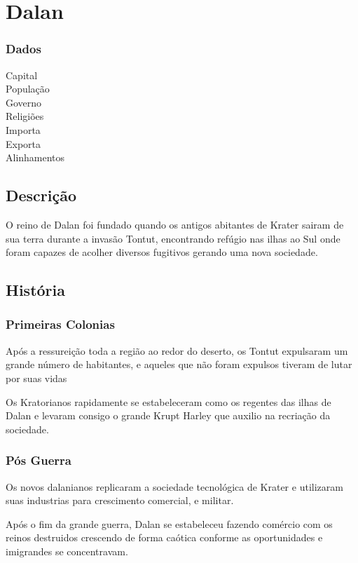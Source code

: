\section{Dalan}
\subsubsection{Dados}
  \begin{description}
   \item[Capital]
   \item[Popula\c{c}\~ao]
   \item[Governo]
   \item[Religi\~oes]
   \item[Importa]
   \item[Exporta]
   \item[Alinhamentos]
  \end{description}

\subsection{Descri\c{c}\~ao}

O reino de Dalan foi fundado quando os antigos abitantes de Krater sairam de sua
terra durante a invas\~{a}o Tontut, encontrando ref\'ugio nas ilhas ao Sul onde
foram capazes de acolher diversos fugitivos gerando uma nova sociedade.

\subsection{Hist\'oria}
\subsubsection{Primeiras Colonias}
Ap\'os a ressurei\c{c}\~ao toda a regi\~ao ao redor do deserto, os Tontut expulsaram
um grande n\'umero de habitantes, e aqueles que n\~ao foram expulsos tiveram de lutar
por suas vidas

Os Kratorianos rapidamente se estabeleceram como os regentes das ilhas de Dalan e
levaram consigo o grande Krupt Harley que auxilio na recria\c{c}\~ao da sociedade.

\subsubsection{P\'os Guerra}
Os novos dalanianos replicaram a sociedade tecnol\'ogica de Krater e utilizaram suas
industrias para crescimento comercial, e militar.

Ap\'os o fim da grande guerra, Dalan se estabeleceu fazendo com\'ercio com os reinos
destruidos crescendo de forma ca\'otica conforme as oportunidades e imigrandes
se concentravam.

